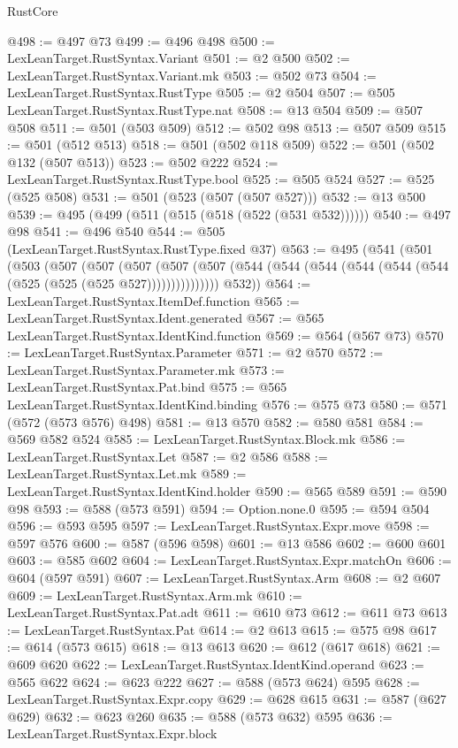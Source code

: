 \begin{lexlean}{RustCore}
\begin{coremodule}
@498 := @497 @73
@499 := @496 @498
@500 := LexLeanTarget.RustSyntax.Variant
@501 := @2 @500
@502 := LexLeanTarget.RustSyntax.Variant.mk
@503 := @502 @73
@504 := LexLeanTarget.RustSyntax.RustType
@505 := @2 @504
@507 := @505 LexLeanTarget.RustSyntax.RustType.nat
@508 := @13 @504
@509 := @507 @508
@511 := @501 (@503 @509)
@512 := @502 @98
@513 := @507 @509
@515 := @501 (@512 @513)
@518 := @501 (@502 @118 @509)
@522 := @501 (@502 @132 (@507 @513))
@523 := @502 @222
@524 := LexLeanTarget.RustSyntax.RustType.bool
@525 := @505 @524
@527 := @525 (@525 @508)
@531 := @501 (@523 (@507 (@507 @527)))
@532 := @13 @500
@539 := @495 (@499 (@511 (@515 (@518 (@522 (@531 @532))))))
@540 := @497 @98
@541 := @496 @540
@544 := @505 (LexLeanTarget.RustSyntax.RustType.fixed @37)
@563 := @495
    (@541
      (@501
        (@503
          (@507
            (@507
              (@507
                (@507
                  (@507 (@544 (@544 (@544 (@544 (@544 (@544 (@525 (@525 (@525 @527)))))))))))))))
        @532))
@564 := LexLeanTarget.RustSyntax.ItemDef.function
@565 := LexLeanTarget.RustSyntax.Ident.generated
@567 := @565 LexLeanTarget.RustSyntax.IdentKind.function
@569 := @564 (@567 @73)
@570 := LexLeanTarget.RustSyntax.Parameter
@571 := @2 @570
@572 := LexLeanTarget.RustSyntax.Parameter.mk
@573 := LexLeanTarget.RustSyntax.Pat.bind
@575 := @565 LexLeanTarget.RustSyntax.IdentKind.binding
@576 := @575 @73
@580 := @571 (@572 (@573 @576) @498)
@581 := @13 @570
@582 := @580 @581
@584 := @569 @582 @524
@585 := LexLeanTarget.RustSyntax.Block.mk
@586 := LexLeanTarget.RustSyntax.Let
@587 := @2 @586
@588 := LexLeanTarget.RustSyntax.Let.mk
@589 := LexLeanTarget.RustSyntax.IdentKind.holder
@590 := @565 @589
@591 := @590 @98
@593 := @588 (@573 @591)
@594 := Option.none.{0}
@595 := @594 @504
@596 := @593 @595
@597 := LexLeanTarget.RustSyntax.Expr.move
@598 := @597 @576
@600 := @587 (@596 @598)
@601 := @13 @586
@602 := @600 @601
@603 := @585 @602
@604 := LexLeanTarget.RustSyntax.Expr.matchOn
@606 := @604 (@597 @591)
@607 := LexLeanTarget.RustSyntax.Arm
@608 := @2 @607
@609 := LexLeanTarget.RustSyntax.Arm.mk
@610 := LexLeanTarget.RustSyntax.Pat.adt
@611 := @610 @73
@612 := @611 @73
@613 := LexLeanTarget.RustSyntax.Pat
@614 := @2 @613
@615 := @575 @98
@617 := @614 (@573 @615)
@618 := @13 @613
@620 := @612 (@617 @618)
@621 := @609 @620
@622 := LexLeanTarget.RustSyntax.IdentKind.operand
@623 := @565 @622
@624 := @623 @222
@627 := @588 (@573 @624) @595
@628 := LexLeanTarget.RustSyntax.Expr.copy
@629 := @628 @615
@631 := @587 (@627 @629)
@632 := @623 @260
@635 := @588 (@573 @632) @595
@636 := LexLeanTarget.RustSyntax.Expr.block

\end{coremodule}
\end{lexlean}
